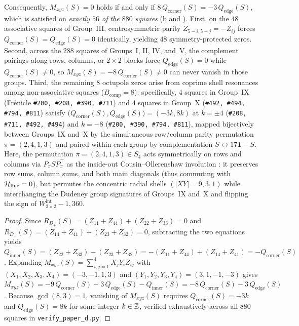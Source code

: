 \begin{proposition}
Consequently, $M_{xyz}(S) = 0$ holds if and only if $8\,Q_{\mathrm{corner}}(S) = -3\,Q_{\mathrm{edge}}(S)$, which is satisfied on \emph{exactly $56$ of the $880$ squares} (b and ). First, on the $48$ associative squares of Group~III, centrosymmetric parity $Z_{5-i,5-j} = -Z_{ij}$ forces $Q_{\mathrm{corner}}(S) = Q_{\mathrm{edge}}(S) = 0$ identically, yielding $48$ symmetry-protected zeros. Second, across the $288$ squares of Groups~I, II, IV, and~V, the complement pairings along rows, columns, or $2\times 2$ blocks force $Q_{\mathrm{edge}}(S) = 0$ while $Q_{\mathrm{corner}}(S) \ne 0$, so $M_{xyz}(S) = -8\,Q_{\mathrm{corner}}(S) \ne 0$ can never vanish in those groups. Third, the remaining $8$ octupole zeros arise from coprime shell resonances among non-associative squares ($B_{\mathrm{comp}}=8$): specifically, $4$ squares in Group~IX (Fr\'enicle \texttt{\#200, \#208, \#390, \#711}) and $4$ squares in Group~X (\texttt{\#492, \#494, \#794, \#811}) satisfy $\bigl(Q_{\mathrm{corner}}(S), Q_{\mathrm{edge}}(S)\bigr) = (-3k, 8k)$ at $k = \pm 4$ (\texttt{\#208, \#711, \#492, \#494}) and $k = -8$ (\texttt{\#200, \#390, \#794, \#811}), mapped bijectively between Groups~IX and~X by the simultaneous row/column parity permutation $\pi = (2,4,1,3)$ and paired within each group by complementation $S \leftrightarrow 17\mathbf{1} - S$. Here, the permutation $\pi = (2,4,1,3) \in S_4$ acts symmetrically on rows and columns via $P_\pi S P_\pi^\top$ as the inside-out Cousin--Ollerenshaw involution \cite{ollerenshaw1998most}: it preserves row sums, column sums, and both main diagonals (thus commuting with $\mathcal{H}_{\mathrm{line}}=0$), but permutes the concentric radial shells $(|XY|=9, 3, 1)$ while interchanging the Dudeney group signatures of Groups~IX and~X and flipping the sign of $W_{2\times 2}^{\mathrm{int}} - 1{,}360$.
\end{proposition}

\begin{proof}
Since $R_{D_+}(S) = (Z_{11}+Z_{44}) + (Z_{22}+Z_{33}) = 0$ and $R_{D_-}(S) = (Z_{14}+Z_{41}) + (Z_{23}+Z_{32}) = 0$, subtracting the two equations yields $Q_{\mathrm{inner}}(S) = (Z_{22}+Z_{33}) - (Z_{23}+Z_{32}) = -(Z_{11}+Z_{44}) + (Z_{14}+Z_{41}) = -Q_{\mathrm{corner}}(S)$. Expanding $M_{xyz}(S) = \sum_{i,j=1}^4 X_j Y_i Z_{ij}$ with $(X_1,X_2,X_3,X_4) = (-3,-1,1,3)$ and $(Y_1,Y_2,Y_3,Y_4) = (3,1,-1,-3)$ gives $M_{xyz}(S) = -9\,Q_{\mathrm{corner}}(S) - 3\,Q_{\mathrm{edge}}(S) - Q_{\mathrm{inner}}(S) = -8\,Q_{\mathrm{corner}}(S) - 3\,Q_{\mathrm{edge}}(S)$. Because $\gcd(8,3)=1$, vanishing of $M_{xyz}(S)$ requires $Q_{\mathrm{corner}}(S) = -3k$ and $Q_{\mathrm{edge}}(S) = 8k$ for some integer $k \in \mathbb{Z}$, verified exhaustively across all $880$ squares in \texttt{verify\_paper\_d.py}.
\end{proof}

